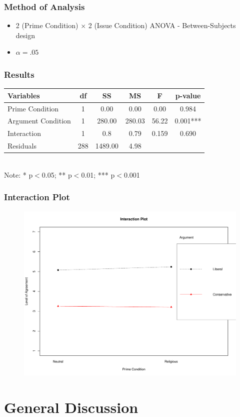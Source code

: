\documentclass[14pt]{beamer}
\newcommand\tb{\textbf}
\begin{document}
\begin{frame}
\frametitle{Method of Analysis}
\begin{itemize}
	\item 2 (Prime Condition) $\times$ 2 (Issue Condition) ANOVA - Between-Subjects design
	\item $\alpha = .05$
\end{itemize}
\end{frame}

\begin{frame}
\frametitle{Results}
\begin{table}
	\centering
	\small
	\begin{tabular}{lccccc}
		\hline
		\tb{Variables}&\tb{df}&\tb{SS}&\tb{MS}&\tb{F}&\tb{p-value}\\
		\hline
		Prime Condition&1&0.00&0.00&0.00&0.984\\
		Argument Condition&1&280.00&280.03&56.22&0.001***\\
		Interaction&1&0.8&0.79&0.159&0.690\\
		Residuals&288&1489.00&4.98&&\\
		\hline
	\end{tabular}\\
Note: * p$<$0.05; ** p$<$0.01; *** p$<$0.001
\end{table}
\end{frame}

\begin{frame}
\frametitle{Interaction Plot}
\begin{figure}
	\centering
	{\includegraphics[width=.8\textwidth]{InteractionPlot}}
\end{figure}
\end{frame}

\section{General Discussion}
\end{document}
